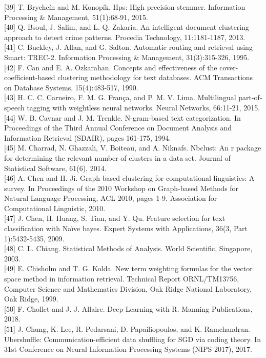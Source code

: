 \documentclass[10pt]{book}
\begin{document}
[39] T. Brychcín and M. Konopík. Hps: High precision stemmer. Information Processing \& Management, 51(1):68-91, 2015.\\[0pt]
[40] Q. Bsoul, J. Salim, and L. Q. Zakaria. An intelligent document clustering approach to detect crime patterns. Procedia Technology, 11:1181-1187, 2013.\\[0pt]
[41] C. Buckley, J. Allan, and G. Salton. Automatic routing and retrieval using Smart: TREC-2. Information Processing \& Management, 31(3):315-326, 1995.\\[0pt]
[42] F. Can and E. A. Ozkarahan. Concepts and effectiveness of the cover-coefficient-based clustering methodology for text databases. ACM Transactions on Database Systems, 15(4):483-517, 1990.\\[0pt]
[43] H. C. C. Carneiro, F. M. G. França, and P. M. V. Lima. Multilingual part-of-speech tagging with weightless neural networks. Neural Networks, 66:11-21, 2015.\\[0pt]
[44] W. B. Cavnar and J. M. Trenkle. N-gram-based text categorization. In Proceedings of the Third Annual Conference on Document Analysis and Information Retrieval (SDAIR), pages 161-175, 1994.\\[0pt]
[45] M. Charrad, N. Ghazzali, V. Boiteau, and A. Niknafs. Nbclust: An r package for determining the relevant number of clusters in a data set. Journal of Statistical Software, 61(6), 2014.\\[0pt]
[46] A. Chen and H. Ji. Graph-based clustering for computational linguistics: A survey. In Proceedings of the 2010 Workshop on Graph-based Methods for Natural Language Processing, ACL 2010, pages 1-9. Association for Computational Linguistic, 2010.\\[0pt]
[47] J. Chen, H. Huang, S. Tian, and Y. Qu. Feature selection for text classification with Naïve bayes. Expert Systems with Applications, 36(3, Part 1):5432-5435, 2009.\\[0pt]
[48] C. L. Chiang. Statistical Methods of Analysis. World Scientific, Singapore, 2003.\\[0pt]
[49] E. Chisholm and T. G. Kolda. New term weighting formulas for the vector space method in information retrieval. Technical Report ORNL/TM13756, Computer Science and Mathematics Division, Oak Ridge National Laboratory, Oak Ridge, 1999.\\[0pt]
[50] F. Chollet and J. J. Allaire. Deep Learning with R. Manning Publications, 2018.\\[0pt]
[51] J. Chung, K. Lee, R. Pedarsani, D. Papailiopoulos, and K. Ramchandran. Ubershuffle: Communication-efficient data shuffling for SGD via coding theory. In 31st Conference on Neural Information Processing Systems (NIPS 2017), 2017.\\[0pt]
\end{document}
